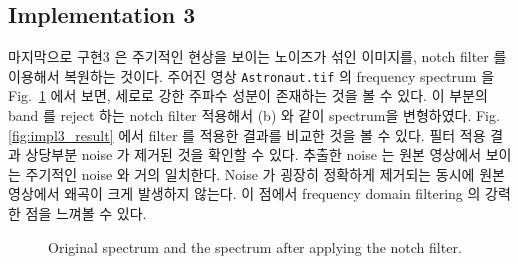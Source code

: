 \documentclass[a4paper, 12p]{paper}
\def\code#1{\texttt{#1}}
\begin{document}
\subsection{Implementation 3}
마지막으로 구현3 은 주기적인 현상을 보이는 노이즈가 섞인 이미지를, notch filter 를 이용해서 복원하는 것이다. 주어진 영상 \code{Astronaut.tif} 의 frequency spectrum 을 Fig.~\ref{fig:impl3_spectrum} 에서 보면, 세로로 강한 주파수 성분이 존재하는 것을 볼 수 있다. 이 부분의 band 를 reject 하는 notch filter 적용해서 (b) 와 같이 spectrum을 변형하였다. Fig.\ref{fig:impl3_result} 에서 filter 를 적용한 결과를 비교한 것을 볼 수 있다. 필터 적용 결과 상당부분 noise 가 제거된 것을 확인할 수 있다. 추출한 noise 는 원본 영상에서 보이는 주기적인 noise 와 거의 일치한다. Noise 가 굉장히 정확하게 제거되는 동시에 원본 영상에서 왜곡이 크게 발생하지 않는다. 이 점에서 frequency domain filtering 의 강력한 점을 느껴볼 수 있다.

\begin{figure}[H]
\centering
{}
\caption{Original spectrum and the spectrum after applying the notch filter.}\label{fig:impl3_spectrum}
\end{figure}
\end{document}
